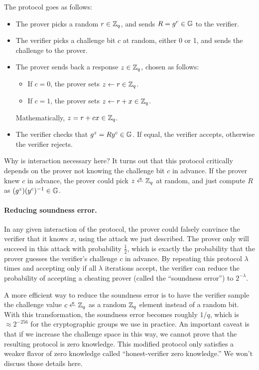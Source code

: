 The protocol goes as follows:
\begin{itemize}

\item The prover picks a random $r\in \mathbb{Z}_q$, and sends $R=g^r\in \mathbb{G}$ to the verifier.

\item The verifier picks a challenge bit $c$ at random, either 0 or 1,
      and sends the challenge to the prover.

\item The prover sends back a response $z \in \mathbb{Z}_q$, chosen as follows: 
  \begin{itemize}
    \item If $c=0$, the prover sets $z \gets r \in \mathbb{Z}_q$.
    \item If $c=1$, the prover sets $z \gets r+x\in \mathbb{Z}_q$.
  \end{itemize}
  Mathematically, $z=r+cx\in \mathbb{Z}_q$.

\item The verifier checks that $g^z=R y^{c}\in \mathbb{G}$.  If equal, the verifier accepts,
  otherwise the verifier rejects.

\end{itemize}

Why is interaction necessary here?
It turns out that this protocol critically depends on the prover 
not knowing the challenge bit $c$
in advance.  If the prover knew $c$ in advance, the prover could pick
$z \getsr \Z_q$ at random, and just compute $R$ as $(g^z)(y^c)^{-1}\in \mathbb{G}$.

\paragraph{Reducing soundness error.}
In any given interaction of the protocol, the prover could falsely
convince the verifier that it knows $x$, using the attack we just
described. The prover only will succeed in this attack with probability $\frac 12$,
which is exactly the probability that the prover guesses the verifier's challenge
$c$ in advance.
By repeating this protocol $\lambda$ times and accepting only if all $\lambda$
iterations accept, the verifier
can reduce the probability of accepting a cheating prover (called the ``soundness
error'') to $2^{-\lambda}$.

A more efficient way to reduce the soundness error is to have 
the verifier sample the challenge value $c \getsr \Z_q$ as a
random $\mathbb{Z}_q$ element instead of a random bit.
With this transformation, the soundness error becomes roughly $1/q$,
which is $\approx 2^{-256}$ for the cryptographic groups we use in practice.
An important caveat is that if we increase the challenge space in this way,
we cannot prove that the resulting protocol is zero knowledge.
This modified protocol only
satisfies a weaker flavor of zero knowledge called ``honest-verifier zero knowledge.''
We won't discuss those details here.



